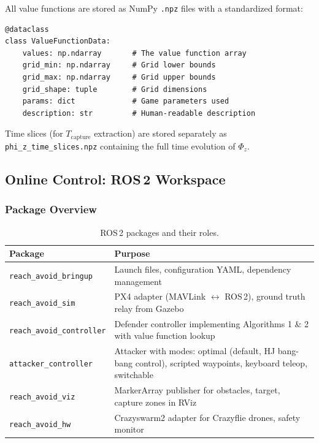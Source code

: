 \documentclass[11pt,a4paper]{article}
\begin{document}
All value functions are stored as NumPy \texttt{.npz} files with a standardized format:

\begin{lstlisting}[style=pythonstyle]
@dataclass
class ValueFunctionData:
    values: np.ndarray       # The value function array
    grid_min: np.ndarray     # Grid lower bounds
    grid_max: np.ndarray     # Grid upper bounds
    grid_shape: tuple        # Grid dimensions
    params: dict             # Game parameters used
    description: str         # Human-readable description
\end{lstlisting}

Time slices (for $T_\text{capture}$ extraction) are stored separately as \texttt{phi\_z\_time\_slices.npz} containing the full time evolution of $\Phi_z$.

\subsection{Online Control: ROS\,2 Workspace}

\subsubsection{Package Overview}

\begin{table}[h]
\centering
\caption{ROS\,2 packages and their roles.}
\begin{tabular}{lp{8cm}}
\toprule
\textbf{Package} & \textbf{Purpose} \\
\midrule
\texttt{reach\_avoid\_bringup} & Launch files, configuration YAML, dependency management \\
\texttt{reach\_avoid\_sim} & PX4 adapter (MAVLink $\leftrightarrow$ ROS\,2), ground truth relay from Gazebo \\
\texttt{reach\_avoid\_controller} & Defender controller implementing Algorithms 1 \& 2 with value function lookup \\
\texttt{attacker\_controller} & Attacker with modes: optimal (default, HJ bang-bang control), scripted waypoints, keyboard teleop, switchable \\
\texttt{reach\_avoid\_viz} & MarkerArray publisher for obstacles, target, capture zones in RViz \\
\texttt{reach\_avoid\_hw} & Crazyswarm2 adapter for Crazyflie drones, safety monitor \\
\bottomrule
\end{tabular}
\end{table}
\end{document}
